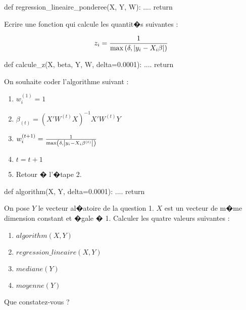 \begin{xexercice}
\begin{verbatimx}
def regression_lineaire_ponderee(X, Y, W):
    ....
    return
\end{verbatimx}

\exequest Ecrire une fonction qui calcule les quantit�s suivantes :

$$z_i = \frac{1}{\max\left( \delta, \left | y_i - X_i \beta \right | \right)}$$


\begin{verbatimx}
def calcule_z(X, beta, Y, W, delta=0.0001):
    ....
    return
\end{verbatimx}

\exequest  On souhaite coder l'algorithme suivant :

\begin{enumerate}
\item $w_i^{(1)} = 1$
\item $\beta_{(t)} = (X'W^{(t)}X)^{-1}X'W^{(t)}Y$
\item $w_i^{(t+1)} = \frac{1}{\max\left( \delta, \left | y_i - X_i \beta^{(t)} \right | \right)}$
\item $t = t+1$
\item Retour � l'�tape 2.
\end{enumerate}

\begin{verbatimx}
def algorithm(X, Y, delta=0.0001):
    ....
    return
\end{verbatimx}

\exequest On pose $Y$ le vecteur al�atoire de la question 1. $X$ est un vecteur de m�me dimension constant et �gale � 1. Calculer les quatre valeurs suivantes : 

\begin{enumerate}
\item $algorithm(X,Y)$
\item $regression\_lineaire(X,Y)$
\item $mediane(Y)$
\item $moyenne(Y)$
\end{enumerate}

Que constatez-vous ?

\end{xexercice}



%
